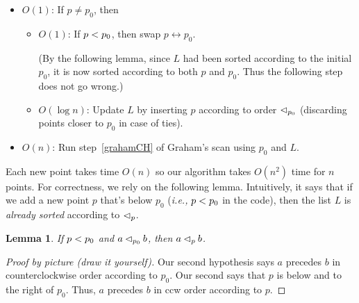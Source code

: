 \documentclass[a4paper]{article}
\newtheorem{mylemma}{\textbf{Lemma}}
\newcommand{\swap}{\leftrightarrow}
\newcommand{\ie}{\emph{i.e.,} }
\begin{document}
\begin{itemize}

	\item $O(1)$: If $p \not= p_0$, then
	
	\begin{itemize}
		\item $O(1)$: If $p < p_0$, then swap $p \swap p_0$.
		
		(By the following lemma, since $L$ had been sorted according to the initial $p_0$, it is now sorted according to both $p$ and $p_0$.
		Thus the following step does not go wrong.)

		\item $O(\log n)$: Update $L$ by inserting $p$ according to order $\lhd_{p_0}$ (discarding points closer to $p_0$ in case of ties).
	\end{itemize}
	
	\item $O(n)$: Run step~\eqref{grahamCH} of Graham's scan using $p_0$ and $L$.
	
\end{itemize}
Each new point takes time $O(n)$ so our algorithm takes $O(n^2)$ time for $n$ points.
For correctness, we rely on the following lemma.
Intuitively, it says that if we add a new point $p$ that's below $p_0$ (\ie $p < p_0$ in the code), then the list $L$ is \emph{already sorted} according to $\lhd_{p}$.

\begin{mylemma}
	If $p < p_0$ and $a \lhd_{p_0} b$, then $a \lhd_{p} b$.
\end{mylemma}

\begin{proof}[Proof by picture (draw it yourself)]
	Our second hypothesis says $a$ precedes $b$ in counterclockwise order according to $p_0$.
	Our second says that $p$ is below and to the right of $p_0$.
	Thus, $a$ precedes $b$ in ccw order according to $p$.
\end{proof}
\end{document}
